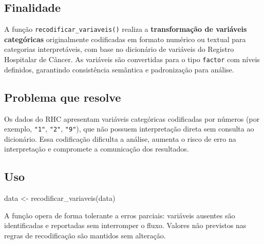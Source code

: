 \documentclass[
  brazilian,
  a4paper,
  oneside]{scrbook}
\newenvironment{Shaded}{\begin{snugshade}}{\end{snugshade}}
\newcommand{\FunctionTok}[1]{\textcolor[rgb]{0.28,0.35,0.67}{#1}}
\newcommand{\NormalTok}[1]{\textcolor[rgb]{0.00,0.23,0.31}{#1}}
\newcommand{\OtherTok}[1]{\textcolor[rgb]{0.00,0.23,0.31}{#1}}
\begin{document}
\subsection{Finalidade}\label{finalidade-3}

A função \texttt{recodificar\_variaveis()} realiza a
\textbf{transformação de variáveis categóricas} originalmente
codificadas em formato numérico ou textual para categorias
interpretáveis, com base no dicionário de variáveis do Registro
Hospitalar de Câncer. As variáveis são convertidas para o tipo
\texttt{factor} com níveis definidos, garantindo consistência semântica
e padronização para análise.

\subsection{Problema que resolve}\label{problema-que-resolve-3}

Os dados do RHC apresentam variáveis categóricas codificadas por números
(por exemplo, \texttt{"1"}, \texttt{"2"}, \texttt{"9"}), que não possuem
interpretação direta sem consulta ao dicionário. Essa codificação
dificulta a análise, aumenta o risco de erro na interpretação e
compromete a comunicação dos resultados.

\subsection{Uso}\label{uso-3}

\begin{Shaded}
\begin{Highlighting}[]
\NormalTok{data }\OtherTok{\textless{}{-}} \FunctionTok{recodificar\_variaveis}\NormalTok{(data)}
\end{Highlighting}
\end{Shaded}

\begin{tcolorbox}[enhanced jigsaw, arc=.35mm, bottomrule=.15mm, bottomtitle=1mm, breakable, colback=white, colbacktitle=quarto-callout-note-color!10!white, colframe=quarto-callout-note-color-frame, coltitle=black, left=2mm, leftrule=.75mm, opacityback=0, opacitybacktitle=0.6, rightrule=.15mm, title=\textcolor{quarto-callout-note-color}{\faInfo}\hspace{0.5em}{Tolerância a variações}, titlerule=0mm, toprule=.15mm, toptitle=1mm]

A função opera de forma tolerante a erros parciais: variáveis ausentes
são identificadas e reportadas sem interromper o fluxo. Valores não
previstos nas regras de recodificação são mantidos sem alteração.

\end{tcolorbox}
\end{document}
